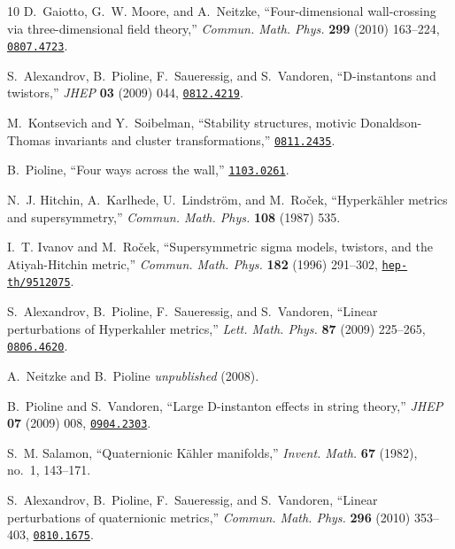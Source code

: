 \documentclass[12pt,reqno]{article}
\numberwithin{equation}{section}
\numberwithin{equation}{section}
\begin{document}
\begin{thebibliography}{10}
D.~Gaiotto, G.~W. Moore, and A.~Neitzke, ``{Four-dimensional wall-crossing via
  three-dimensional field theory},'' {\em Commun. Math. Phys.} {\bf 299} (2010)
  163--224,
\href{http://www.arXiv.org/abs/0807.4723}{{\tt 0807.4723}}.

S.~Alexandrov, B.~Pioline, F.~Saueressig, and S.~Vandoren, ``{D-instantons and
  twistors},'' {\em JHEP} {\bf 03} (2009) 044,
\href{http://www.arXiv.org/abs/0812.4219}{{\tt 0812.4219}}.

M.~Kontsevich and Y.~Soibelman, ``{Stability structures, motivic
  Donaldson-Thomas invariants and cluster transformations},''
  \href{http://www.arXiv.org/abs/0811.2435}{{\tt 0811.2435}}.

B.~Pioline, ``{Four ways across the wall},''
\href{http://www.arXiv.org/abs/1103.0261}{{\tt 1103.0261}}.

N.~J. Hitchin, A.~Karlhede, U.~Lindstr{\"o}m, and M.~Ro\v{c}ek,
  ``Hyperk{\"a}hler metrics and supersymmetry,'' {\em Commun. Math. Phys.} {\bf
  108} (1987)
535.

I.~T. Ivanov and M.~Ro\v{c}ek, ``{S}upersymmetric sigma models, twistors, and
  the {A}tiyah-{H}itchin metric,'' {\em Commun. Math. Phys.} {\bf 182} (1996)
  291--302,
\href{http://www.arXiv.org/abs/hep-th/9512075}{{\tt hep-th/9512075}}.

S.~Alexandrov, B.~Pioline, F.~Saueressig, and S.~Vandoren, ``{Linear
  perturbations of Hyperkahler metrics},'' {\em Lett. Math. Phys.} {\bf 87}
  (2009) 225--265,
\href{http://www.arXiv.org/abs/0806.4620}{{\tt 0806.4620}}.

A.~Neitzke and B.~Pioline {\em unpublished} (2008).

B.~Pioline and S.~Vandoren, ``{Large D-instanton effects in string theory},''
  {\em JHEP} {\bf 07} (2009) 008,
\href{http://www.arXiv.org/abs/0904.2303}{{\tt 0904.2303}}.

S.~M. Salamon, ``Quaternionic {K}\"ahler manifolds,'' {\em Invent. Math.} {\bf
  67} (1982), no.~1, 143--171.

S.~Alexandrov, B.~Pioline, F.~Saueressig, and S.~Vandoren, ``{Linear
  perturbations of quaternionic metrics},'' {\em Commun. Math. Phys.} {\bf 296}
  (2010) 353--403,
\href{http://www.arXiv.org/abs/0810.1675}{{\tt 0810.1675}}.


\end{thebibliography}
\end{document}
